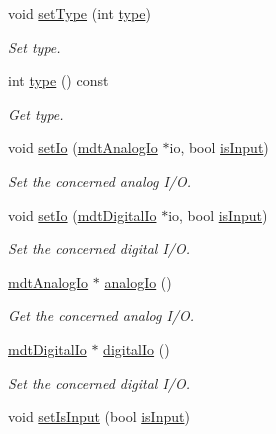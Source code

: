 \begin{DoxyCompactItemize}
void \hyperlink{classmdt_port_transaction_a4398eb06986d858d3d0a63f6a290f0bf}{set\-Type} (int \hyperlink{classmdt_port_transaction_aa8acfc909bb1956b16cca02d721357f4}{type})
\begin{DoxyCompactList}\small\item\em Set type. \end{DoxyCompactList}\item 
int \hyperlink{classmdt_port_transaction_aa8acfc909bb1956b16cca02d721357f4}{type} () const 
\begin{DoxyCompactList}\small\item\em Get type. \end{DoxyCompactList}\item 
void \hyperlink{classmdt_port_transaction_a122a98e4e93295c9907ed7cd0bde1f19}{set\-Io} (\hyperlink{classmdt_analog_io}{mdt\-Analog\-Io} $\ast$io, bool \hyperlink{classmdt_port_transaction_a2aaf0f003556d7f93ec2d3846589673d}{is\-Input})
\begin{DoxyCompactList}\small\item\em Set the concerned analog I/\-O. \end{DoxyCompactList}\item 
void \hyperlink{classmdt_port_transaction_a4062fb0e9a1d5fea0ec934bff54cd519}{set\-Io} (\hyperlink{classmdt_digital_io}{mdt\-Digital\-Io} $\ast$io, bool \hyperlink{classmdt_port_transaction_a2aaf0f003556d7f93ec2d3846589673d}{is\-Input})
\begin{DoxyCompactList}\small\item\em Set the concerned digital I/\-O. \end{DoxyCompactList}\item 
\hyperlink{classmdt_analog_io}{mdt\-Analog\-Io} $\ast$ \hyperlink{classmdt_port_transaction_a59409e826441bcff560ea3e44b885d64}{analog\-Io} ()
\begin{DoxyCompactList}\small\item\em Get the concerned analog I/\-O. \end{DoxyCompactList}\item 
\hyperlink{classmdt_digital_io}{mdt\-Digital\-Io} $\ast$ \hyperlink{classmdt_port_transaction_a0515e5ded32eb76047586fdb6274d3eb}{digital\-Io} ()
\begin{DoxyCompactList}\small\item\em Set the concerned digital I/\-O. \end{DoxyCompactList}\item 
void \hyperlink{classmdt_port_transaction_ad49afb93f44aca47ded0e03018f8266f}{set\-Is\-Input} (bool \hyperlink{classmdt_port_transaction_a2aaf0f003556d7f93ec2d3846589673d}{is\-Input})

\end{DoxyCompactItemize}
